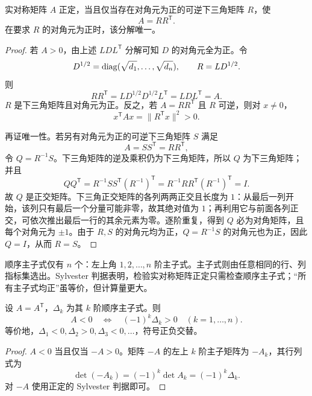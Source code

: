 \begin{corollary}
实对称矩阵 $A$ 正定，当且仅当存在对角元为正的可逆下三角矩阵 $R$，使
\[
A=RR^{\mathsf T}.
\]
在要求 $R$ 的对角元为正时，该分解唯一。
\end{corollary}
\begin{proof}
若 $A>0$，由上述 $LDL^{\mathsf T}$ 分解可知 $D$ 的对角元全为正。令
\[
D^{1/2}=\operatorname{diag}(\sqrt{d_1},\ldots,\sqrt{d_n}),\qquad R=LD^{1/2}.
\]
则
\[
RR^{\mathsf T}=LD^{1/2}D^{1/2}L^{\mathsf T}=LDL^{\mathsf T}=A.
\]
$R$ 是下三角矩阵且对角元为正。反之，若 $A=RR^{\mathsf T}$ 且 $R$ 可逆，则对 $x\ne0$，
\[
x^{\mathsf T}Ax=\lVert R^{\mathsf T}x\rVert^2>0.
\]

再证唯一性。若另有对角元为正的可逆下三角矩阵 $S$ 满足
\[
A=SS^{\mathsf T}=RR^{\mathsf T},
\]
令 $Q=R^{-1}S$。下三角矩阵的逆及乘积仍为下三角矩阵，所以 $Q$ 为下三角矩阵；并且
\[
QQ^{\mathsf T}
=R^{-1}SS^{\mathsf T}(R^{-1})^{\mathsf T}
=R^{-1}RR^{\mathsf T}(R^{-1})^{\mathsf T}=I.
\]
故 $Q$ 是正交矩阵。下三角正交矩阵的各列两两正交且长度为 $1$：从最后一列开始，该列只有最后一个分量可能非零，故其绝对值为 $1$；再利用它与前面各列正交，可依次推出最后一行的其余元素为零。逐阶重复，得到 $Q$ 必为对角矩阵，且每个对角元为 $\pm1$。由于 $R,S$ 的对角元均为正，$Q=R^{-1}S$ 的对角元也为正，因此 $Q=I$，从而 $R=S$。
\end{proof}

\begin{remark}
顺序主子式仅有 $n$ 个：左上角 $1,2,\ldots,n$ 阶主子式。主子式则由任意相同的行、列指标集选出。Sylvester 判据表明，检验实对称矩阵正定只需检查顺序主子式；“所有主子式均正”虽等价，但计算量更大。
\end{remark}

\begin{corollary}
设 $A=A^{\mathsf T}$，$\Delta_k$ 为其 $k$ 阶顺序主子式。则
\[
A<0
\quad\Longleftrightarrow\quad
(-1)^k\Delta_k>0\quad(k=1,\ldots,n).
\]
等价地，$\Delta_1<0,\Delta_2>0,\Delta_3<0,\ldots$，符号正负交替。
\end{corollary}
\begin{proof}
$A<0$ 当且仅当 $-A>0$。矩阵 $-A$ 的左上 $k$ 阶主子矩阵为 $-A_k$，其行列式为
\[
\det(-A_k)=(-1)^k\det A_k=(-1)^k\Delta_k.
\]
对 $-A$ 使用正定的 Sylvester 判据即可。
\end{proof}

